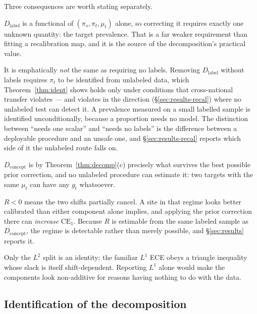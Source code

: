 Three consequences are worth stating separately.

\begin{remark}
$D_{\mathrm{label}}$ is a functional of $(\pi_s,\pi_t,\mu_t)$ alone, so
correcting it requires exactly one unknown quantity: the target prevalence.
That is a far weaker requirement than fitting a recalibration map, and it is the
source of the decomposition's practical value.

It is emphatically \emph{not} the same as requiring no labels.  Removing
$D_{\mathrm{label}}$ without labels requires $\pi_t$ to be identified from
unlabeled data, which Theorem~\ref{thm:ident} shows holds only under
conditions that cross-national transfer violates --- and violates in the
direction (\S\ref{sec:results-recal}) where no unlabeled test can detect it.  A
prevalence measured on a small labelled sample is identified unconditionally,
because a proportion needs no model.  The distinction between ``needs one
scalar'' and ``needs no labels'' is the difference between a deployable
procedure and an unsafe one, and \S\ref{sec:results-recal} reports which side
of it the unlabeled route falls on.

$D_{\mathrm{concept}}$ is by Theorem~\ref{thm:decomp}(c) precisely what survives
the best possible prior correction, and no unlabeled procedure can estimate it:
two targets with the same $\mu_t$ can have any $g_t$ whatsoever.
\end{remark}

\begin{remark}\label{rem:R}
$R<0$ means the two shifts partially cancel.  A site in that regime looks
better calibrated than either component alone implies, and applying the prior
correction there can \emph{increase} $\mathrm{CE}_1$.  Because $R$ is estimable
from the same labeled sample as $D_{\mathrm{concept}}$, the regime is
detectable rather than merely possible, and \S\ref{sec:results} reports it.
\end{remark}

\begin{remark}
Only the $L^2$ split is an identity; the familiar $L^1$ ECE obeys a triangle
inequality whose slack is itself shift-dependent.  Reporting $L^1$ alone would
make the components look non-additive for reasons having nothing to do with the
data.
\end{remark}

\subsection{Identification of the decomposition}
\label{sec:ident}

